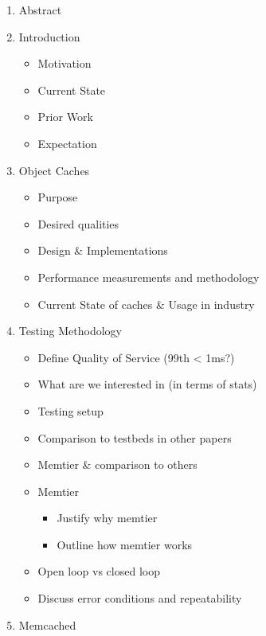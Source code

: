 \begin{enumerate}
\def\labelenumi{\arabic{enumi}.}
\tightlist
\item
  Abstract
\item
  Introduction

  \begin{itemize}
  \tightlist
  \item
    Motivation
  \item
    Current State
  \item
    Prior Work
  \item
    Expectation
  \end{itemize}
\item
  Object Caches

  \begin{itemize}
  \tightlist
  \item
    Purpose
  \item
    Desired qualities
  \item
    Design \& Implementations
  \item
    Performance measurements and methodology
  \item
    Current State of caches \& Usage in industry
  \end{itemize}
\item
  Testing Methodology

  \begin{itemize}
  \tightlist
  \item
    Define Quality of Service (99th \textless{} 1ms?)
  \item
    What are we interested in (in terms of stats)
  \item
    Testing setup
  \item
    Comparison to testbeds in other papers
  \item
    Memtier \& comparison to others
  \item
    Memtier

    \begin{itemize}
    \tightlist
    \item
      Justify why memtier
    \item
      Outline how memtier works
    \end{itemize}
  \item
    Open loop vs closed loop
  \item
    Discuss error conditions and repeatability
  \end{itemize}
\item
  Memcached


\end{enumerate}
